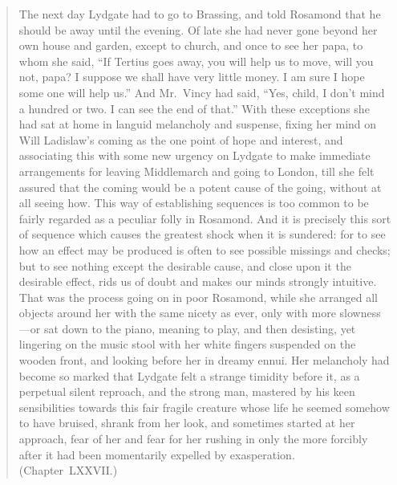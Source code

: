 \documentclass[10pt]{article}
\begin{document}
\begin{quote}
  The next day Lydgate had to go to Brassing, and told Rosamond that he should be away until the evening.
  Of late she had never gone beyond her own house and garden, except to church, and once to see her papa, to whom she said,
  ``If Tertius goes away, you will help us to move, will you not, papa?
  I suppose we shall have very little money.
  I am sure I hope some one will help us.''
  And Mr.\ Vincy had said,
  ``Yes, child, I don't mind a hundred or two.
  I can see the end of that.''
  With these exceptions she had sat at home in languid melancholy and suspense, fixing her mind on Will Ladislaw's coming as the one point of hope and interest, and associating this with some new urgency on Lydgate to make immediate arrangements for leaving Middlemarch and going to London, till she felt assured that the coming would be a potent cause of the going, without at all seeing how.
  This way of establishing sequences is too common to be fairly regarded as a peculiar folly in Rosamond.
  And it is precisely this sort of sequence which causes the greatest shock when it is sundered: for to see how an effect may be produced is often to see possible missings and checks; but to see nothing except the desirable cause, and close upon it the desirable effect, rids us of doubt and makes our minds strongly intuitive.
  That was the process going on in poor Rosamond, while she arranged all objects around her with the same nicety as ever, only with more slowness---or sat down to the piano, meaning to play, and then desisting, yet lingering on the music stool with her white fingers suspended on the wooden front, and looking before her in dreamy ennui.
  Her melancholy had become so marked that Lydgate felt a strange timidity before it, as a perpetual silent reproach, and the strong man, mastered by his keen sensibilities towards this fair fragile creature whose life he seemed somehow to have bruised, shrank from her look, and sometimes started at her approach, fear of her and fear for her rushing in only the more forcibly after it had been momentarily expelled by exasperation.\linebreak
  \mbox{}\hfill\mbox{(Chapter LXXVII.)}
\end{quote}
\end{document}
